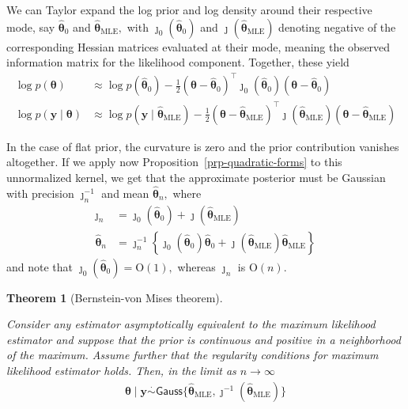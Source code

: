 \documentclass[
  11pt,
  letterpaper,
]{scrbook}
\theoremstyle{definition}
\theoremstyle{plain}
\theoremstyle{plain}
\newtheorem{theorem}{Theorem}[chapter]
\theoremstyle{plain}
\theoremstyle{definition}
\theoremstyle{definition}
\theoremstyle{plain}
\theoremstyle{plain}
\theoremstyle{remark}
\begin{document}
We can Taylor expand the log prior and log density around their
respective mode, say \(\widehat{\boldsymbol{\theta}}_0\) and
\(\widehat{\boldsymbol{\theta}}_{\mathrm{MLE}},\) with
\(\jmath_0(\widehat{\boldsymbol{\theta}}_0)\) and
\(\jmath(\widehat{\boldsymbol{\theta}}_{\mathrm{MLE}})\) denoting
negative of the corresponding Hessian matrices evaluated at their mode,
meaning the observed information matrix for the likelihood component.
Together, these yield \begin{align*}
\log p(\boldsymbol{\theta}) &\approx \log p(\widehat{\boldsymbol{\theta}}_0) - \frac{1}{2}(\boldsymbol{\theta} - \widehat{\boldsymbol{\theta}}_0)^\top\jmath_0(\widehat{\boldsymbol{\theta}}_0)(\boldsymbol{\theta} - \widehat{\boldsymbol{\theta}}_0)\\
\log p(\boldsymbol{y} \mid \boldsymbol{\theta}) &\approx \log p(\boldsymbol{y} \mid  \widehat{\boldsymbol{\theta}}_{\mathrm{MLE}}) - \frac{1}{2}(\boldsymbol{\theta} - \widehat{\boldsymbol{\theta}}_{\mathrm{MLE}})^\top\jmath(\widehat{\boldsymbol{\theta}}_{\mathrm{MLE}})(\boldsymbol{\theta} - \widehat{\boldsymbol{\theta}}_{\mathrm{MLE}})
\end{align*}

In the case of flat prior, the curvature is zero and the prior
contribution vanishes altogether. If we apply now
Proposition~\ref{prp-quadratic-forms} to this unnormalized kernel, we
get that the approximate posterior must be Gaussian with precision
\(\jmath_n^{-1}\) and mean \(\widehat{\boldsymbol{\theta}}_n,\) where
\begin{align*}
\jmath_n &= \jmath_0(\widehat{\boldsymbol{\theta}}_{0}) + \jmath(\widehat{\boldsymbol{\theta}}_{\mathrm{MLE}})\\
\widehat{\boldsymbol{\theta}}_n &= \jmath_n^{-1}\left\{ \jmath_0(\widehat{\boldsymbol{\theta}}_{0})\widehat{\boldsymbol{\theta}}_{0} + \jmath(\widehat{\boldsymbol{\theta}}_{\mathrm{MLE}})\widehat{\boldsymbol{\theta}}_{\mathrm{MLE}}\right\}
\end{align*} and note that
\(\jmath_0(\widehat{\boldsymbol{\theta}}_{0}) = \mathrm{O}(1),\) whereas
\(\jmath_n\) is \(\mathrm{O}(n).\)

\begin{theorem}[Bernstein-von Mises
theorem]\protect\hypertarget{thm-berstein-von-mises}{}\label{thm-berstein-von-mises}

Consider any estimator asymptotically equivalent to the maximum
likelihood estimator and suppose that the prior is continuous and
positive in a neighborhood of the maximum. Assume further that the
regularity conditions for maximum likelihood estimator holds. Then, in
the limit as \(n \to \infty\) \begin{align*}
\boldsymbol{\theta} \mid \boldsymbol{y} \stackrel{\cdot}{\sim} \mathsf{Gauss}\{ \widehat{\boldsymbol{\theta}}_{\mathrm{MLE}},  \jmath^{-1}(\widehat{\boldsymbol{\theta}}_{\mathrm{MLE}})\}
\end{align*}

\end{theorem}
\end{document}
